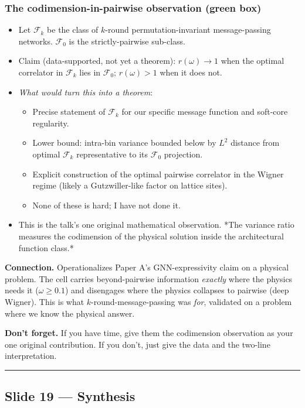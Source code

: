 \documentclass[11pt]{article}
\begin{document}
\subsubsection*{The codimension-in-pairwise observation (green box)}

\begin{itemize}
\item Let $\mathcal F_k$ be the class of $k$-round permutation-invariant
message-passing networks. $\mathcal F_0$ is the strictly-pairwise
sub-class.
\item Claim (data-supported, not yet a theorem): $r(\omega) \to 1$ when the
optimal correlator in $\mathcal F_k$ lies in $\mathcal F_0$;
$r(\omega) > 1$ when it does not.
\item \emph{What would turn this into a theorem}:
\begin{itemize}
\item Precise statement of $\mathcal F_k$ for our specific message function
and soft-core regularity.
\item Lower bound: intra-bin variance bounded below by $L^2$ distance from
optimal $\mathcal F_k$ representative to its $\mathcal F_0$ projection.
\item Explicit construction of the optimal pairwise correlator in the
Wigner regime (likely a Gutzwiller-like factor on lattice sites).
\item None of these is hard; I have not done it.
\end{itemize}
\item This is the talk's one original mathematical observation. *The
variance ratio measures the codimension of the physical solution
inside the architectural function class.*
\end{itemize}
\textbf{Connection.} Operationalizes Paper A's GNN-expressivity claim on a
physical problem. The cell carries beyond-pairwise information \emph{exactly}
where the physics needs it ($\omega \ge 0.1$) and disengages where the
physics collapses to pairwise (deep Wigner). This is what
$k$-round-message-passing was \emph{for}, validated on a problem where we know
the physical answer.

\textbf{Don't forget.} If you have time, give them the codimension observation
as your one original contribution. If you don't, just give the data and
the two-line interpretation.

\vspace{4pt}\hrule\vspace{8pt}

\subsection*{Slide 19 --- Synthesis}
\end{document}
